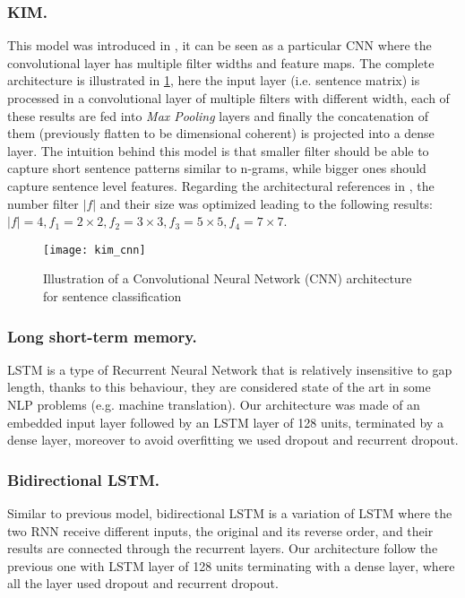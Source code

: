 \subsubsection{KIM.}
This model was introduced in \cite{kim2014convolutional}, it can be seen as a particular CNN where the convolutional layer has multiple filter widths and feature maps.
The complete architecture is illustrated in \cref{fig:kim}, here the input layer (i.e. sentence matrix) is processed in a convolutional layer of multiple filters with different width, each of these results are fed into \emph{Max Pooling} layers and finally the concatenation of them (previously flatten to be dimensional coherent) is projected into a dense layer.
The intuition behind this model is that smaller filter should be able to capture short sentence patterns similar to n-grams, while bigger ones should capture sentence level features.
Regarding the architectural references in \cite{kim2014convolutional}, the number filter $|f|$ and their size was optimized leading to the following results: $|f| = 4, f_1 = 2\times2, f_2 = 3\times3, f_3 = 5\times5, f_4 = 7\times7$.

\begin{figure}[h]
\footnotesize
\centering
\texttt{[image: kim\_cnn]}
\caption{\cite{zhang2015sensitivity} Illustration of a Convolutional Neural Network (CNN) architecture for sentence classification}
\label{fig:kim}
\end{figure}

\subsubsection{Long short-term memory.}
LSTM is a type of Recurrent Neural Network that is relatively insensitive to gap length, thanks to this behaviour, they are considered state of the art in some NLP problems (e.g. machine translation).
Our architecture was made of an embedded input layer followed by an LSTM layer of 128 units, terminated by a dense layer, moreover to avoid overfitting we used dropout and recurrent dropout.

\subsubsection{Bidirectional LSTM.} Similar to previous model, bidirectional LSTM is a variation of LSTM where the two RNN receive different inputs, the original and its reverse order, and their results are connected through the recurrent layers.
Our architecture follow the previous one with LSTM layer of 128 units terminating with a dense layer, where all the layer used dropout and recurrent dropout.

